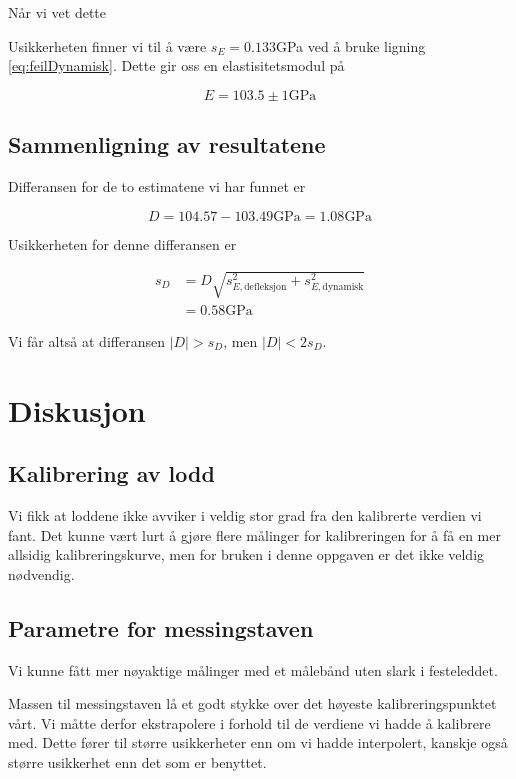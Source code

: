 \documentclass[a4paper,11pt, twocolumn]{article}
\begin{document}
Når vi vet dette 

Usikkerheten finner vi til å være $s_E = 0.133$GPa ved å bruke ligning \ref{eq:feilDynamisk}. Dette gir oss en elastisitetsmodul på

\begin{equation}
	E = 103.5\pm1\text{GPa}
\end{equation}

\subsection{Sammenligning av resultatene}
Differansen for de to estimatene vi har funnet er 

\begin{equation}
	D = 104.57-103.49\text{GPa} = 1.08\text{GPa} 
\end{equation}

Usikkerheten for denne differansen er 

\begin{align}
s_D &= D\sqrt{s_{E, \text{defleksjon}}^2+s_{E, \text{dynamisk}}^2}\\
&= 0.58\text{GPa}
\end{align}

Vi får altså at differansen $|D|>s_D$, men $|D|<2s_D$.
\section{Diskusjon}

\subsection{Kalibrering av lodd}
Vi fikk at loddene ikke avviker i veldig stor grad fra den kalibrerte verdien vi fant. Det kunne vært lurt å gjøre flere målinger for kalibreringen for å få en mer allsidig kalibreringskurve, men for bruken i denne oppgaven er det ikke veldig nødvendig.

\subsection{Parametre for messingstaven}
Vi kunne fått mer nøyaktige målinger med et målebånd uten slark i festeleddet.

Massen til messingstaven lå et godt stykke over det høyeste kalibreringspunktet vårt. Vi måtte derfor ekstrapolere i forhold til de verdiene vi hadde å kalibrere med. Dette fører til større usikkerheter enn om vi hadde interpolert, kanskje også større usikkerhet enn det som er benyttet.
\end{document}
